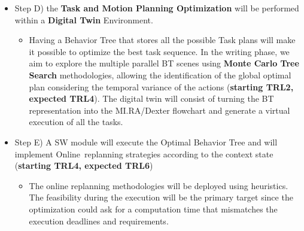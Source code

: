 \begin{itemize}[arrow]
  \begin{itemize}
  \item
    At the state of the art, many solvers compute the best task plan
    given the time duration of the tasks. However, no temporal planner
    is still available off-the-shelves that also considers the variance
    in the duration of the tasks, and a few papers are dedicated to this
    issue. Since such a solver is out of the competence of the working
    team, we will follow an alternative path. We will translate the PDDL
    into a behavior tree using time variability to allow a search for
    the best solution over the behavior tree (see next point). This SW
    module will exploit STNU (Simple Temporal Network \textbf{with}
    Uncertainty) and consist of the straightforward extension of
    existing tools that turn PDDL into a Simple Temporal Network
    \textbf{without} Uncertainty (\textbf{starting TRL4, expected
    TRL6}).
  \end{itemize}
\item
  Step D) the \textbf{Task and Motion Planning Optimization} will be
  performed within a \textbf{Digital Twin} Environment.

  \begin{itemize}
  \item
    Having a Behavior Tree that stores all the possible Task plans will
    make it possible to optimize the best task sequence. In the writing
    phase, we aim to explore the multiple parallel BT scenes using
    \textbf{Monte Carlo Tree Search} methodologies, allowing the
    identification of the global optimal plan considering the temporal
    variance of the actions (\textbf{starting TRL2, expected TRL4}). The
    digital twin will consist of turning the BT representation into the
    MI.RA/Dexter flowchart and generate a virtual execution of all the
    tasks.
  \end{itemize}
\item
  Step E) A SW module will execute the Optimal Behavior Tree and will
  implement Online~replanning strategies according to the context state
  (\textbf{starting TRL4, expected TRL6})

  \begin{itemize}
  \item
    The online replanning methodologies will be deployed using
    heuristics. The feasibility during the execution will be the primary
    target since the optimization could ask for a computation time that
    mismatches the execution deadlines and requirements.
  \end{itemize}
\end{itemize}

